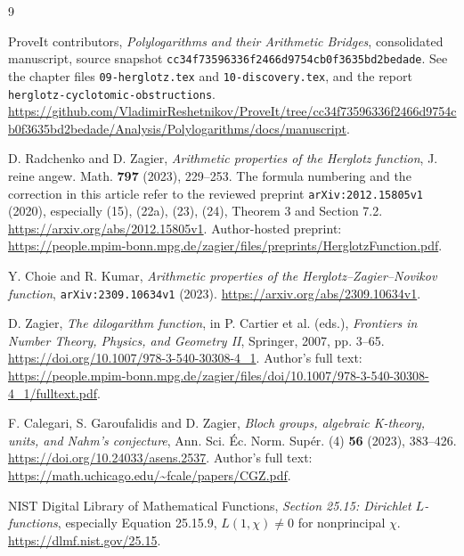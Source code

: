 \begin{thebibliography}{9}

ProveIt contributors,
\emph{Polylogarithms and their Arithmetic Bridges},
consolidated manuscript, source snapshot
\texttt{cc34f73596336f2466d9754cb0f3635bd2bedade}.
See the chapter files \nolinkurl{09-herglotz.tex} and
\nolinkurl{10-discovery.tex}, and the report
\nolinkurl{herglotz-cyclotomic-obstructions}.
\url{https://github.com/VladimirReshetnikov/ProveIt/tree/cc34f73596336f2466d9754cb0f3635bd2bedade/Analysis/Polylogarithms/docs/manuscript}.

D. Radchenko and D. Zagier,
\emph{Arithmetic properties of the Herglotz function},
J. reine angew. Math. \textbf{797} (2023), 229--253.
The formula numbering and the correction in this article refer to the
reviewed preprint \texttt{arXiv:2012.15805v1} (2020), especially
(15), (22a), (23), (24), Theorem 3 and Section 7.2.
\url{https://arxiv.org/abs/2012.15805v1}.
Author-hosted preprint:
\url{https://people.mpim-bonn.mpg.de/zagier/files/preprints/HerglotzFunction.pdf}.

Y. Choie and R. Kumar,
\emph{Arithmetic properties of the Herglotz--Zagier--Novikov function},
\texttt{arXiv:2309.10634v1} (2023).
\url{https://arxiv.org/abs/2309.10634v1}.

D. Zagier,
\emph{The dilogarithm function}, in
P. Cartier et al. (eds.), \emph{Frontiers in Number Theory, Physics, and
Geometry II}, Springer, 2007, pp. 3--65.
\url{https://doi.org/10.1007/978-3-540-30308-4_1}.
Author's full text:
\url{https://people.mpim-bonn.mpg.de/zagier/files/doi/10.1007/978-3-540-30308-4_1/fulltext.pdf}.

F. Calegari, S. Garoufalidis and D. Zagier,
\emph{Bloch groups, algebraic K-theory, units, and Nahm's conjecture},
Ann. Sci. \'Ec. Norm. Sup\'er. (4) \textbf{56} (2023), 383--426.
\url{https://doi.org/10.24033/asens.2537}.
Author's full text: \url{https://math.uchicago.edu/~fcale/papers/CGZ.pdf}.

NIST Digital Library of Mathematical Functions,
\emph{Section 25.15: Dirichlet $L$-functions},
especially Equation 25.15.9, $L(1,\chi)\ne0$ for nonprincipal $\chi$.
\url{https://dlmf.nist.gov/25.15}.

\end{thebibliography}
